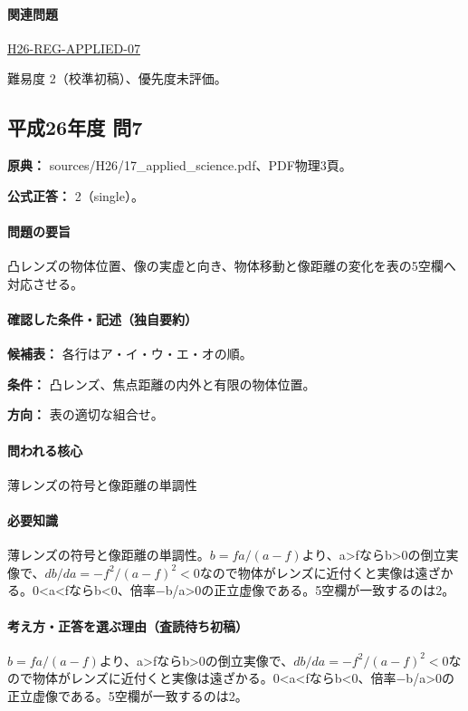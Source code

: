 \paragraph{関連問題} \hyperref[q:h26-reg-applied-07]{H26-REG-APPLIED-07}

\par 難易度 2（校準初稿）、優先度未評価。

\subsection{平成26年度 問7}
\label{q:h26-reg-applied-07}

\noindent\textbf{原典：} sources/H26/17\_applied\_science.pdf、PDF物理3頁。

\textbf{公式正答：} 2（single）。

\paragraph{問題の要旨} 凸レンズの物体位置、像の実虚と向き、物体移動と像距離の変化を表の5空欄へ対応させる。

\paragraph{確認した条件・記述（独自要約）}\mbox{}\par

\noindent\textbf{候補表：} 各行はア・イ・ウ・エ・オの順。\par

\noindent\textbf{条件：} 凸レンズ、焦点距離の内外と有限の物体位置。\par

\noindent\textbf{方向：} 表の適切な組合せ。\par

\paragraph{問われる核心} 薄レンズの符号と像距離の単調性

\paragraph{必要知識} 薄レンズの符号と像距離の単調性。\(b=fa/(a-f)\)より、a>fならb>0の倒立実像で、\(db/da=-f^2/(a-f)^2<0\)なので物体がレンズに近付くと実像は遠ざかる。0<a<fならb<0、倍率−b/a>0の正立虚像である。5空欄が一致するのは2。

\paragraph{考え方・正答を選ぶ理由（査読待ち初稿）} \(b=fa/(a-f)\)より、a>fならb>0の倒立実像で、\(db/da=-f^2/(a-f)^2<0\)なので物体がレンズに近付くと実像は遠ざかる。0<a<fならb<0、倍率−b/a>0の正立虚像である。5空欄が一致するのは2。

